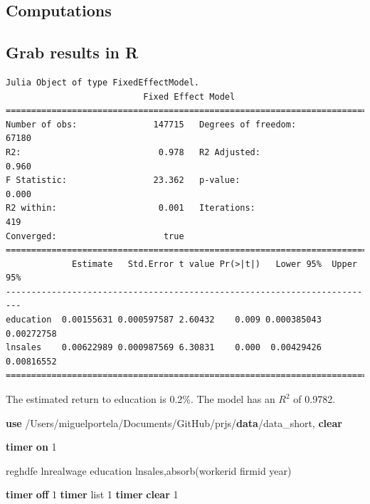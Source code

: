 \documentclass[
  12pt,
]{article}
\newenvironment{Shaded}{\begin{snugshade}}{\end{snugshade}}
\newcommand{\FunctionTok}[1]{\textcolor[rgb]{0.00,0.00,0.00}{#1}}
\newcommand{\KeywordTok}[1]{\textcolor[rgb]{0.13,0.29,0.53}{\textbf{#1}}}
\newcommand{\NormalTok}[1]{#1}
\newcommand{\OtherTok}[1]{\textcolor[rgb]{0.56,0.35,0.01}{#1}}
\begin{document}
\hypertarget{computations}{%
\subsection{Computations}\label{computations}}

\hypertarget{grab-results-in-r}{%
\subsection{Grab results in R}\label{grab-results-in-r}}

\begin{verbatim}
Julia Object of type FixedEffectModel.
                           Fixed Effect Model                           
=========================================================================
Number of obs:               147715   Degrees of freedom:           67180
R2:                           0.978   R2 Adjusted:                  0.960
F Statistic:                 23.362   p-value:                      0.000
R2 within:                    0.001   Iterations:                     419
Converged:                     true   
=========================================================================
             Estimate   Std.Error t value Pr(>|t|)   Lower 95%  Upper 95%
-------------------------------------------------------------------------
education  0.00155631 0.000597587 2.60432    0.009 0.000385043 0.00272758
lnsales    0.00622989 0.000987569 6.30831    0.000  0.00429426 0.00816552
=========================================================================
\end{verbatim}

\vspace{0.3cm}

The estimated return to education is 0.2\%. The model has an \(R^2\) of 0.9782.

\vspace{0.3cm}

\begin{Shaded}
\begin{Highlighting}[]

\KeywordTok{use}\NormalTok{ /Users/miguelportela/Documents/GitHub/prjs/}\KeywordTok{data}\NormalTok{/data_short, }\KeywordTok{clear}

\KeywordTok{timer} \KeywordTok{on}\NormalTok{ 1}

\NormalTok{    reghdfe lnrealwage education lnsales,absorb(workerid firmid }\FunctionTok{year}\NormalTok{)}

\KeywordTok{timer} \KeywordTok{off}\NormalTok{ 1}
\KeywordTok{timer} \OtherTok{list}\NormalTok{ 1}
\KeywordTok{timer} \KeywordTok{clear}\NormalTok{ 1}
\end{Highlighting}
\end{Shaded}
\end{document}
